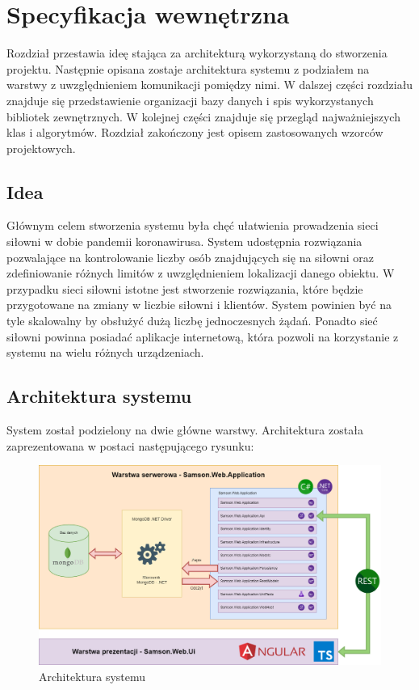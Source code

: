 \documentclass[a4paper,twoside,12pt]{book}
\begin{document}
\chapter{Specyfikacja wewnętrzna}
Rozdział przestawia ideę stająca za architekturą wykorzystaną do stworzenia projektu. Następnie opisana zostaje architektura systemu z podziałem na warstwy z uwzględnieniem komunikacji pomiędzy nimi. W dalszej części rozdziału znajduje się przedstawienie organizacji bazy danych i spis wykorzystanych bibliotek zewnętrznych. W kolejnej części znajduje się przegląd najważniejszych klas i algorytmów. Rozdział zakończony jest opisem zastosowanych wzorców projektowych.

\section{Idea}
Głównym celem stworzenia systemu była chęć ułatwienia prowadzenia sieci siłowni w dobie pandemii koronawirusa. System udostępnia rozwiązania pozwalające na kontrolowanie liczby osób znajdujących się na siłowni oraz zdefiniowanie różnych limitów z uwzględnieniem lokalizacji danego obiektu. W przypadku sieci siłowni istotne jest stworzenie rozwiązania, które będzie przygotowane na zmiany w liczbie siłowni i klientów. System powinien być na tyle skalowalny by obsłużyć dużą liczbę jednoczesnych żądań. Ponadto sieć siłowni powinna posiadać aplikacje internetową, która pozwoli na korzystanie z systemu na wielu różnych urządzeniach.

\section{Architektura systemu}
System został podzielony na dwie główne warstwy. Architektura została zaprezentowana w postaci następującego rysunku:
\begin{figure}[H]
	\centering
	\includegraphics[width=1\linewidth]{../diagramy/architektura}
	\caption{Architektura systemu}
	\label{fig:architektura}
\end{figure}
\end{document}
